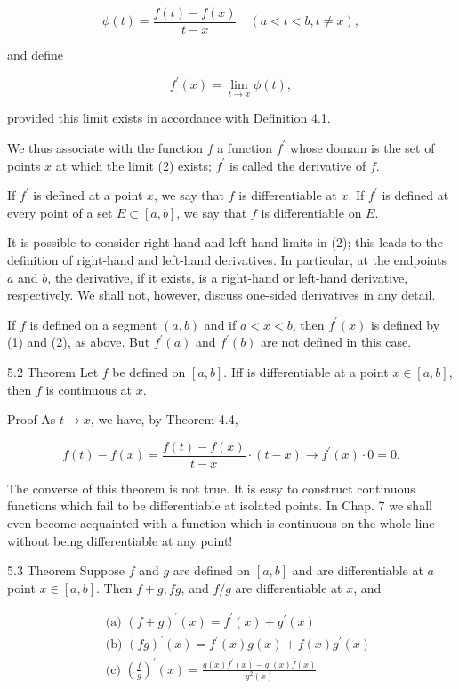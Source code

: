 \documentclass[10pt]{article}
\begin{document}
$$
\phi(t)=\frac{f(t)-f(x)}{t-x} \quad(a<t<b, t \neq x),
$$

and define

$$
f^{\prime}(x)=\lim _{t \rightarrow x} \phi(t),
$$

provided this limit exists in accordance with Definition 4.1.

We thus associate with the function $f$ a function $f^{\prime}$ whose domain is the set of points $x$ at which the limit (2) exists; $f^{\prime}$ is called the derivative of $f$.

If $f^{\prime}$ is defined at a point $x$, we say that $f$ is differentiable at $x$. If $f^{\prime}$ is defined at every point of a set $E \subset[a, b]$, we say that $f$ is differentiable on $E$.

It is possible to consider right-hand and left-hand limits in (2); this leads to the definition of right-hand and left-hand derivatives. In particular, at the endpoints $a$ and $b$, the derivative, if it exists, is a right-hand or left-hand derivative, respectively. We shall not, however, discuss one-sided derivatives in any detail.

If $f$ is defined on a segment $(a, b)$ and if $a<x<b$, then $f^{\prime}(x)$ is defined by (1) and (2), as above. But $f^{\prime}(a)$ and $f^{\prime}(b)$ are not defined in this case.

5.2 Theorem Let $f$ be defined on $[a, b]$. Iff is differentiable at a point $x \in[a, b]$, then $f$ is continuous at $x$.

Proof As $t \rightarrow x$, we have, by Theorem 4.4,

$$
f(t)-f(x)=\frac{f(t)-f(x)}{t-x} \cdot(t-x) \rightarrow f^{\prime}(x) \cdot 0=0 .
$$

The converse of this theorem is not true. It is easy to construct continuous functions which fail to be differentiable at isolated points. In Chap. 7 we shall even become acquainted with a function which is continuous on the whole line without being differentiable at any point!

5.3 Theorem Suppose $f$ and $g$ are defined on $[a, b]$ and are differentiable at $a$ point $x \in[a, b]$. Then $f+g, f g$, and $f / g$ are differentiable at $x$, and

$$
\begin{aligned}
& \text { (a) }(f+g)^{\prime}(x)=f^{\prime}(x)+g^{\prime}(x) \\
& \text { (b) }(f g)^{\prime}(x)=f^{\prime}(x) g(x)+f(x) g^{\prime}(x) \\
& \text { (c) }\left(\frac{f}{g}\right)^{\prime}(x)=\frac{g(x) f^{\prime}(x)-g^{\prime}(x) f(x)}{g^{2}(x)}
\end{aligned}
$$
\end{document}

